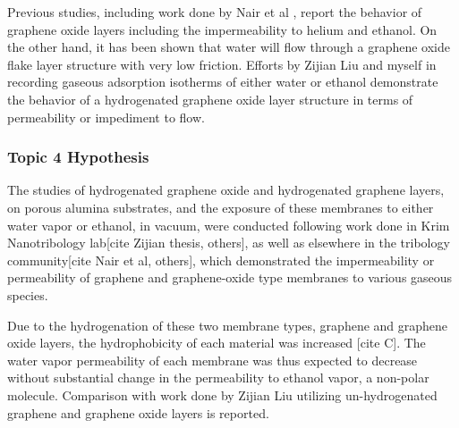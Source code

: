 Previous studies, including work done by Nair et al \cite{108}, report the behavior of graphene oxide layers including the impermeability to helium and ethanol. On the other hand, it has been shown that water will flow through a graphene oxide flake layer structure with very low friction. Efforts by Zijian Liu and myself in recording gaseous adsorption isotherms of either water or ethanol demonstrate the behavior of a hydrogenated graphene oxide layer structure in terms of permeability or impediment to flow.

\subsubsection{Topic 4 Hypothesis}


The studies of hydrogenated graphene oxide and hydrogenated graphene layers, on porous alumina substrates, and the exposure of these membranes to either water vapor or ethanol, in vacuum, were conducted following work done in Krim Nanotribology lab[cite Zijian thesis, others], as well as elsewhere in the tribology community[cite Nair et al, others], which demonstrated the impermeability or permeability of graphene and graphene-oxide type membranes to various gaseous species.

Due to the hydrogenation of these two membrane types, graphene and graphene oxide layers, the hydrophobicity of each material was increased [cite C]. The water vapor permeability of each membrane was thus expected to decrease without substantial change in the permeability to ethanol vapor, a non-polar molecule. Comparison with work done by Zijian Liu utilizing un-hydrogenated graphene and graphene oxide layers  is reported.

